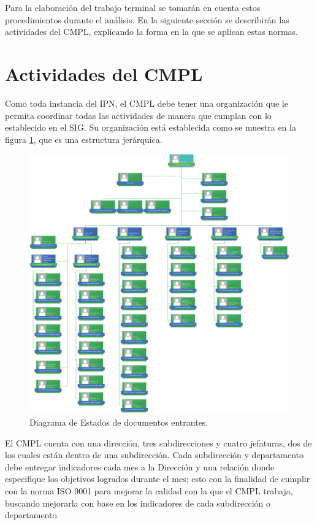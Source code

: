 	Para la elaboración del trabajo terminal se tomarán en cuenta estos procedimientos durante el análisis. En la siguiente sección se describirán las actividades del CMPL, explicando la forma en la que se aplican estas normas.
	
\section{Actividades del CMPL}
	Como toda instancia del IPN, el CMPL debe tener una organización que le permita coordinar todas las actividades de manera que cumplan con lo establecido en el SIG. Su organización está establecida como se muestra en la figura \ref{fig:organigrama}, que es una estructura jerárquica.\\
	
	\begin{figure}[htbp!]
		\centering
			\includegraphics[width=1\textwidth]{images/antecedentes/OrganigramaCMPL.png}
		\caption{Diagrama de Estados de documentos entrantes. \cite{Organigrama}}
		\label{fig:organigrama}
	\end{figure}
	
	El CMPL cuenta con una dirección, tres subdirecciones y cuatro jefaturas, dos de los cuales están dentro de una subdirección. Cada subdirección y departamento debe entregar indicadores cada mes a la Dirección y una relación donde especifique los objetivos logrados durante el mes; esto con la finalidad de cumplir con la norma ISO 9001 para mejorar la calidad con la que el CMPL trabaja, buscando mejorarla con base en los indicadores de cada subdirección o departamento.\\
	
